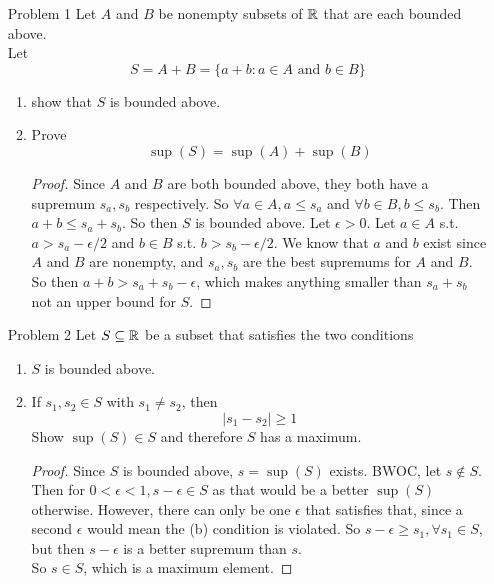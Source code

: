 \documentclass[14pt]{extarticle}
\begin{document}
\begin{enumerate}
		\item[Problem 1] Let $A$ and $B$ be nonempty subsets of $\mathbb{R}$ that are each bounded above.\\
		Let \[S = A+B = \{a+b : a \in A \text{ and } b \in B\}\]
		\begin{enumerate}
			\item show that $S$ is bounded above.
			\item Prove \[\sup(S) = \sup(A) + \sup(B)\]
			\begin{proof}
				Since $A$ and $B$ are both bounded above, they both have a supremum $s_a,s_b$ respectively. So $\forall a \in A, a \leq s_a$ and $\forall b \in B, b \leq s_b$. Then $a+b \leq s_a+s_b$. So then $S$ is bounded above.\m
				Let $\epsilon > 0$. Let $a \in A$ s.t. $a>s_a-\epsilon/2$ and $b \in B$ s.t. $b>s_b-\epsilon/2$. We know that $a$ and $b$ exist since $A$ and $B$ are nonempty, and $s_a,s_b$ are the best supremums for $A$ and $B$.\\
				So then $a+b > s_a + s_b - \epsilon$, which makes anything smaller than $s_a + s_b$ not an upper bound for $S$.
			\end{proof}
		\end{enumerate}
		\item[Problem 2] Let $S \subseteq \mathbb{R}$ be a subset that satisfies the two conditions
		\begin{enumerate}
			\item $S$ is bounded above.
			\item If $s_1,s_2 \in S$ with $s_1 \neq s_2$, then \[|s_1 -s_2| \geq 1\]
			Show $\sup(S) \in S$ and therefore $S$ has a maximum.
			\begin{proof}
				Since $S$ is bounded above, $s = \sup(S)$ exists. BWOC, let $s \nin S$. Then for $0 < \epsilon < 1, s - \epsilon \in S$ as that would be a better $\sup(S)$ otherwise. However, there can only be one $\epsilon$ that satisfies that, since a second $\epsilon$ would mean the (b) condition is violated. So $s-\epsilon \geq s_1, \forall s_1 \in S$, but then $s-\epsilon$ is a better supremum than $s$. \contra\\
				So $s \in S$, which is a maximum element.
			\end{proof}
		\end{enumerate}
	\end{enumerate}
\end{document}
